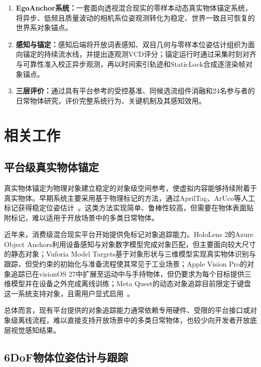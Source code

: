 \documentclass[review]{vgtc}
\begin{document}
\begin{enumerate}
  \item \textbf{EgoAnchor系统：}一套面向透视混合现实的零样本动态真实物体锚定系统，将异步、低频且质量波动的相机系位姿观测转化为稳定、世界一致且可恢复的世界系对象锚点。

  \item \textbf{感知与锚定：}感知后端将开放词表感知、双目几何与零样本位姿估计组织为面向锚定的持续流水线，并提出逐观测VCD评分；锚定运行时通过采集时刻对齐与可靠性准入校正异步观测，再以时间索引轨迹和StaticLock合成逐渲染帧对象锚点。

  \item \textbf{三层评价：}通过具有平台参考的受控基准、同候选流组件消融和24名参与者的日常物体研究，评价完整系统行为、关键机制及其感知效用。
\end{enumerate}

\section{相关工作}\label{sec:related-work}

\subsection{平台级真实物体锚定}

真实物体锚定为物理对象建立稳定的对象级空间参考，使虚拟内容能够持续附着于真实物体。早期系统主要采用基于物理标记的方法，通过AprilTag、ArUco等人工标记获得稳定位姿估计~\cite{kato1999artoolkit,olson2011apriltag,garridojurado2014aruco}。这类方法实现简单、鲁棒性较高，但需要在物体表面贴附标记，难以适用于开放场景中的多类日常物体。

近年来，消费级混合现实平台开始提供免标记对象追踪能力。HoloLens 2的Azure Object Anchors利用设备感知与对象数字模型完成对象匹配，但主要面向较大尺寸的静态对象；Vuforia Model Targets基于对象形状与三维模型实现真实物体识别与跟踪，但受约束的初始化与准备流程使其常见于工业场景；Apple Vision Pro的对象追踪已在visionOS 27中扩展至运动中与手持物体，但仍要求为每个目标提供三维模型并在设备之外完成离线训练；Meta Quest的动态对象追踪目前限定于键盘这一系统支持对象，且需用户显式启用~\cite{appleObjectAnchor,appleObjectTracking2026,azureObjectAnchors,vuforiaModelTargets,metaDynamicObjectTracker}。

总体而言，现有平台提供的对象追踪能力通常依赖专用硬件、受限的平台接口或对象级离线流程，难以直接支持开放场景中的多类日常物体，也较少向开发者开放底层视觉感知结果。

\subsection{6DoF物体位姿估计与跟踪}
\end{document}
